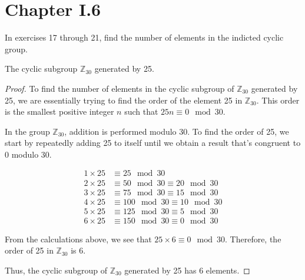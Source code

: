 \documentclass[12pt]{amsart}
\theoremstyle{definition}
\numberwithin{equation}{section}
\theoremstyle{plain}
\newcommand{\Z}{\mathbb{Z}}
\begin{document}
    \section*{Chapter I.6}
    \begin{exercise}{17} In exercises 17 through 21, find the number of elements in the indicted cyclic group.

        The cyclic subgroup $\Z_{30}$ generated by 25.
    
    \begin{proof}
        To find the number of elements in the cyclic subgroup of \( \Z_{30} \) generated by 25, we are essentially trying to find the order of the element 25 in \( \Z_{30} \). This order is the smallest positive integer \( n \) such that \( 25n \equiv 0 \mod 30 \).

        In the group \( \Z_{30} \), addition is performed modulo 30. To find the order of 25, we start by repeatedly adding 25 to itself until we obtain a result that's congruent to 0 modulo 30.
        
        \begin{align*}
        1 \times 25 &\equiv 25 \mod 30 \\
        2 \times 25 &\equiv 50 \mod 30 \equiv 20 \mod 30 \\
        3 \times 25 &\equiv 75 \mod 30 \equiv 15 \mod 30 \\
        4 \times 25 &\equiv 100 \mod 30 \equiv 10 \mod 30 \\
        5 \times 25 &\equiv 125 \mod 30 \equiv 5 \mod 30 \\
        6 \times 25 &\equiv 150 \mod 30 \equiv 0 \mod 30
        \end{align*}
        
        From the calculations above, we see that \( 25 \times 6 \equiv 0 \mod 30 \). Therefore, the order of 25 in \( \Z_{30} \) is 6.
        
        Thus, the cyclic subgroup of \( \Z_{30} \) generated by 25 has 6 elements.
    \end{proof}
    \end{exercise}
\end{document}
